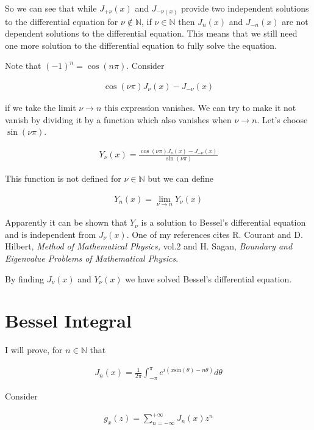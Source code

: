 \documentclass[12pt]{article}
\begin{document}
So we can see that while $J_{+\nu}(x)$ and $J_{-\nu(x)}$ provide two independent solutions to the differential equation for $\nu \notin \mathbb{N}$, if $\nu \in \mathbb{N}$ then $J_{n}(x)$ and $J_{-n}(x)$ are not dependent solutions to the differential equation. This means that we still need one more solution to the differential equation to fully solve the equation.

Note that $(-1)^n = \cos(n\pi)$. Consider

\begin{align}
\cos(\nu \pi) J_{\nu}(x) - J_{-\nu}(x)
\end{align}

if we take the limit $\nu\rightarrow n$ this expression vanishes. We can try to make it not vanish by dividing it by a function which also vanishes when $\nu \rightarrow n$. Let's choose $\sin(\nu \pi)$.

\begin{align}
Y_{\nu}(x) = \frac{\cos(\nu \pi) J_{\nu}(x) - J_{-\nu}(x)}{\sin(\nu \pi)}
\end{align}

This function is not defined for $\nu \in \mathbb{N}$ but we can define

\begin{align}
Y_{n}(x) = \lim_{\nu \rightarrow n}Y_{\nu}(x)
\end{align}

Apparently it can be shown that $Y_{\nu}$ is a solution to Bessel's differential equation and is independent from $J_{\nu}(x)$. One of my references cites R. Courant and D. Hilbert, \textit{Method of Mathematical Physics,} vol.2 and H. Sagan, \textit{Boundary and Eigenvalue Problems of Mathematical Physics}.

By finding $J_{\nu}(x)$ and $Y_{\nu}(x)$ we have solved Bessel's differential equation.

\section{Bessel Integral}

I will prove, for $n \in \mathbb{N}$ that

\begin{align}
J_n(x) = \frac{1}{2\pi}\int_{-\pi}^{\pi} e^{i(x \text{sin}(\theta) - n\theta)} d \theta
\end{align}

Consider

\begin{align}
g_x(z) = \sum_{n=-\infty}^{+\infty} J_n(x) z^n
\end{align}
\end{document}
